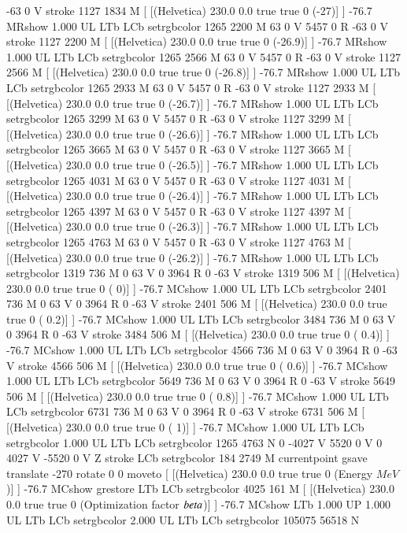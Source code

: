 -63 0 V
stroke
1127 1834 M
[ [(Helvetica) 230.0 0.0 true true 0 (-27)]
] -76.7 MRshow
1.000 UL
LTb
LCb setrgbcolor
1265 2200 M
63 0 V
5457 0 R
-63 0 V
stroke
1127 2200 M
[ [(Helvetica) 230.0 0.0 true true 0 (-26.9)]
] -76.7 MRshow
1.000 UL
LTb
LCb setrgbcolor
1265 2566 M
63 0 V
5457 0 R
-63 0 V
stroke
1127 2566 M
[ [(Helvetica) 230.0 0.0 true true 0 (-26.8)]
] -76.7 MRshow
1.000 UL
LTb
LCb setrgbcolor
1265 2933 M
63 0 V
5457 0 R
-63 0 V
stroke
1127 2933 M
[ [(Helvetica) 230.0 0.0 true true 0 (-26.7)]
] -76.7 MRshow
1.000 UL
LTb
LCb setrgbcolor
1265 3299 M
63 0 V
5457 0 R
-63 0 V
stroke
1127 3299 M
[ [(Helvetica) 230.0 0.0 true true 0 (-26.6)]
] -76.7 MRshow
1.000 UL
LTb
LCb setrgbcolor
1265 3665 M
63 0 V
5457 0 R
-63 0 V
stroke
1127 3665 M
[ [(Helvetica) 230.0 0.0 true true 0 (-26.5)]
] -76.7 MRshow
1.000 UL
LTb
LCb setrgbcolor
1265 4031 M
63 0 V
5457 0 R
-63 0 V
stroke
1127 4031 M
[ [(Helvetica) 230.0 0.0 true true 0 (-26.4)]
] -76.7 MRshow
1.000 UL
LTb
LCb setrgbcolor
1265 4397 M
63 0 V
5457 0 R
-63 0 V
stroke
1127 4397 M
[ [(Helvetica) 230.0 0.0 true true 0 (-26.3)]
] -76.7 MRshow
1.000 UL
LTb
LCb setrgbcolor
1265 4763 M
63 0 V
5457 0 R
-63 0 V
stroke
1127 4763 M
[ [(Helvetica) 230.0 0.0 true true 0 (-26.2)]
] -76.7 MRshow
1.000 UL
LTb
LCb setrgbcolor
1319 736 M
0 63 V
0 3964 R
0 -63 V
stroke
1319 506 M
[ [(Helvetica) 230.0 0.0 true true 0 ( 0)]
] -76.7 MCshow
1.000 UL
LTb
LCb setrgbcolor
2401 736 M
0 63 V
0 3964 R
0 -63 V
stroke
2401 506 M
[ [(Helvetica) 230.0 0.0 true true 0 ( 0.2)]
] -76.7 MCshow
1.000 UL
LTb
LCb setrgbcolor
3484 736 M
0 63 V
0 3964 R
0 -63 V
stroke
3484 506 M
[ [(Helvetica) 230.0 0.0 true true 0 ( 0.4)]
] -76.7 MCshow
1.000 UL
LTb
LCb setrgbcolor
4566 736 M
0 63 V
0 3964 R
0 -63 V
stroke
4566 506 M
[ [(Helvetica) 230.0 0.0 true true 0 ( 0.6)]
] -76.7 MCshow
1.000 UL
LTb
LCb setrgbcolor
5649 736 M
0 63 V
0 3964 R
0 -63 V
stroke
5649 506 M
[ [(Helvetica) 230.0 0.0 true true 0 ( 0.8)]
] -76.7 MCshow
1.000 UL
LTb
LCb setrgbcolor
6731 736 M
0 63 V
0 3964 R
0 -63 V
stroke
6731 506 M
[ [(Helvetica) 230.0 0.0 true true 0 ( 1)]
] -76.7 MCshow
1.000 UL
LTb
LCb setrgbcolor
1.000 UL
LTb
LCb setrgbcolor
1265 4763 N
0 -4027 V
5520 0 V
0 4027 V
-5520 0 V
Z stroke
LCb setrgbcolor
184 2749 M
currentpoint gsave translate -270 rotate 0 0 moveto
[ [(Helvetica) 230.0 0.0 true true 0 (Energy \(MeV\))]
] -76.7 MCshow
grestore
LTb
LCb setrgbcolor
4025 161 M
[ [(Helvetica) 230.0 0.0 true true 0 (Optimization factor $\\beta$)]
] -76.7 MCshow
LTb
1.000 UP
1.000 UL
LTb
LCb setrgbcolor
2.000 UL
LTb
LCb setrgbcolor
105075 56518 N
